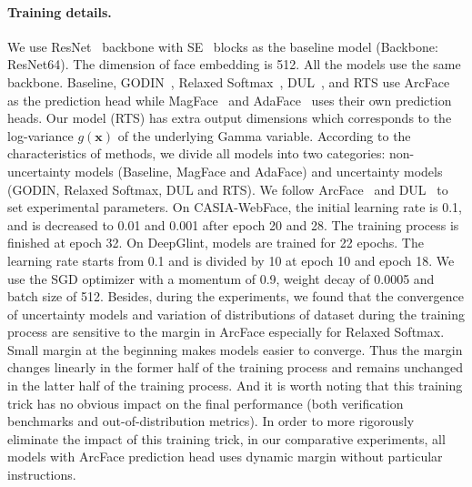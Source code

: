 \documentclass[letterpaper]{article} %
\begin{document}
\paragraph{Training details.}
We use ResNet~\cite{he2016deep} backbone with SE~\cite{hu2018squeeze} blocks as the baseline model (Backbone: ResNet64). The dimension of face embedding is 512. All the models use the same backbone. Baseline, GODIN~\cite{hsu2020generalized}, Relaxed Softmax~\cite{techapanurak2019hyperparameter,neumann18relaxed}, DUL~\cite{chang2020data}, and RTS use ArcFace~\cite{deng2019arcface} as the prediction head while MagFace~\cite{meng2021magface} and AdaFace~\cite{kim2022adaface} uses their own prediction heads. Our model (RTS) has extra output dimensions which corresponds to the log-variance $g(\bm{x})$ of the underlying Gamma variable. According to the characteristics of methods, we divide all models into two categories: non-uncertainty models (Baseline, MagFace and AdaFace) and uncertainty models (GODIN, Relaxed Softmax, DUL and RTS).
We follow ArcFace~\cite{deng2019arcface} and DUL~\cite{chang2020data} to set experimental parameters. On CASIA-WebFace, the initial learning rate is 0.1, and is decreased to 0.01 and 0.001 after epoch 20 and 28. The training process is finished at epoch 32. On DeepGlint, models are trained for 22 epochs. The learning rate starts from 0.1 and is divided by 10 at epoch 10 and epoch 18. We use the SGD optimizer with a momentum of 0.9, weight decay of 0.0005 and batch size of 512. Besides, during the experiments, we found that the convergence of uncertainty models and variation of distributions of dataset during the training process are sensitive to the margin in ArcFace especially for Relaxed Softmax. Small margin at the beginning makes models easier to converge. Thus the margin changes linearly in the former half of the training process and remains unchanged in the latter half of the training process. And it is worth noting that this training trick has no obvious impact on the final performance (both verification benchmarks and out-of-distribution metrics). In order to more rigorously eliminate the impact of this training trick, in our comparative experiments, all models with ArcFace prediction head uses dynamic margin without particular instructions.
\end{document}
